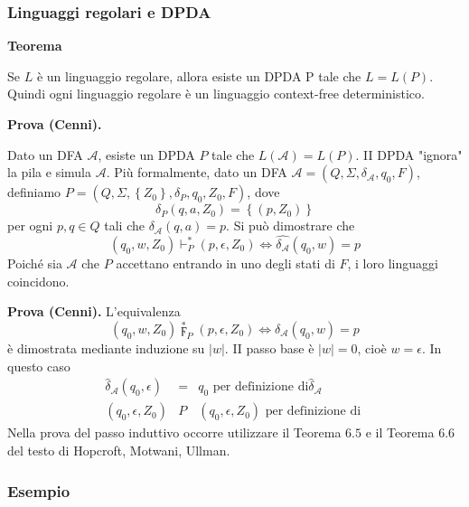 \subsubsection{Linguaggi regolari e DPDA}

\textbf{Teorema}

Se $L$ è un linguaggio regolare, allora esiste un DPDA P tale che $L=L(P)$. Quindi ogni linguaggio regolare è un linguaggio context-free deterministico.

\vspace{5mm}

\textbf{Prova (Cenni).}

Dato un DFA $\mathcal{A}$, esiste un DPDA $P$ tale che $L(\mathcal{A})=L(P) .$
II DPDA "ignora" la pila e simula $\mathcal{A}$.
Più formalmente, dato un DFA $\mathcal{A}=\left(Q, \Sigma, \delta_{\mathcal{A}}, q_{0}, F\right)$, definiamo $P=\left(Q, \Sigma,\left\{Z_{0}\right\}, \delta_{P}, q_{0}, Z_{0}, F\right)$, dove
$$
\delta_{P}\left(q, a, Z_{0}\right)=\left\{\left(p, Z_{0}\right)\right\}
$$
per ogni $p, q \in Q$ tali che $\delta_{\mathcal{A}}(q, a)=p$.
Si può dimostrare che
$$
\left(q_{0}, w, Z_{0}\right) \vdash^{*}_P\left(p, \epsilon, Z_{0}\right) \Leftrightarrow \hat{\delta_{\mathcal{A}}}\left(q_{0}, w\right)=p
$$
Poiché sia $\mathcal{A}$ che $P$ accettano entrando in uno degli stati di $F$, i loro linguaggi coincidono.


\vspace{5mm}

\textbf{Prova (Cenni).}
L'equivalenza
$$
\left(q_{0}, w, Z_{0}\right) \stackrel{*}{\digamma}_{P}\left(p, \epsilon, Z_{0}\right) \Leftrightarrow \delta_{\mathcal{A}}\left(q_{0}, w\right)=p
$$
è dimostrata mediante induzione su $|w|$.
II passo base è $|w|=0$, cioè $w=\epsilon$. In questo caso
$$
\begin{array}{lll}
\hat{\delta}_{\mathcal{A}}\left(q_{0}, \epsilon\right) & = & q_{0} \text { per definizione } \mathrm{di} \hat{\delta}_{\mathcal{A}} \\
\left(q_{0}, \epsilon, Z_{0}\right) & \stackrel{{ }}{P} & \left(q_{0}, \epsilon, Z_{0}\right) \text { per definizione di }
\end{array}
$$
Nella prova del passo induttivo occorre utilizzare il Teorema $6.5$ e il Teorema $6.6$ del testo di Hopcroft, Motwani, Ullman.

\subsubsection{Esempio}

